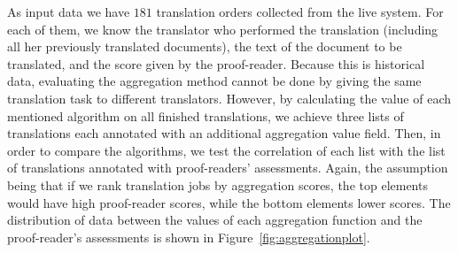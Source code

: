As input data we have $181$ translation orders collected from the live system. For each of them, we know the translator who performed the translation (including all her previously translated documents), the text of the document to be translated, and the score given by the proof-reader. Because this is historical data, evaluating the aggregation method cannot be done by giving the same translation task to different translators. However, by calculating the value of each mentioned algorithm on all finished translations, we achieve three lists of translations each annotated with an additional aggregation value field. Then, in order to compare the algorithms, we test the correlation of each list with the list of translations annotated with proof-readers' assessments. Again, the assumption being that if we rank translation jobs by aggregation scores, the top elements would have high proof-reader scores, while the bottom elements lower scores. The distribution of data between the values of each aggregation function and the proof-reader's assessments is shown in Figure~\ref{fig:aggregationplot}.

